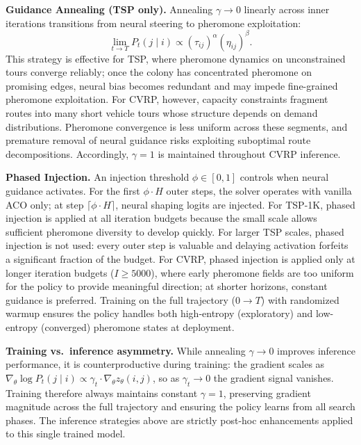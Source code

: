 \documentclass[sigconf]{acmart}
\begin{document}
\textbf{Guidance Annealing (TSP only).}
Annealing $\gamma \to 0$ linearly across inner iterations transitions from neural steering to pheromone exploitation:
\begin{equation}
\lim_{t \to T} P_t(j \mid i) \propto (\tau_{ij})^\alpha (\eta_{ij})^\beta.
\end{equation}
This strategy is effective for TSP, where pheromone dynamics on unconstrained tours converge reliably; once the colony has concentrated pheromone on promising edges, neural bias becomes redundant and may impede fine-grained pheromone exploitation.
For CVRP, however, capacity constraints fragment routes into many short vehicle tours whose structure depends on demand distributions.
Pheromone convergence is less uniform across these segments, and premature removal of neural guidance risks exploiting suboptimal route decompositions.
Accordingly, $\gamma{=}1$ is maintained throughout CVRP inference.

\textbf{Phased Injection.}
An injection threshold $\phi \in [0,1]$ controls when neural guidance activates.
For the first $\phi \cdot H$ outer steps, the solver operates with vanilla ACO only; at step $\lceil\phi \cdot H\rceil$, neural shaping logits are injected.
For TSP-1K, phased injection is applied at all iteration budgets because the small scale allows sufficient pheromone diversity to develop quickly.
For larger TSP scales, phased injection is not used: every outer step is valuable and delaying activation forfeits a significant fraction of the budget.
For CVRP, phased injection is applied only at longer iteration budgets ($I{\geq}5000$), where early pheromone fields are too uniform for the policy to provide meaningful direction; at shorter horizons, constant guidance is preferred.
Training on the full trajectory ($0 \to T$) with randomized warmup ensures the policy handles both high-entropy (exploratory) and low-entropy (converged) pheromone states at deployment.

\textbf{Training vs.\ inference asymmetry.}
While annealing $\gamma \to 0$ improves inference performance, it is counterproductive during training: the gradient scales as $\nabla_\theta \log P_t(j \mid i) \propto \gamma_t \cdot \nabla_\theta z_\theta(i,j)$, so as $\gamma_t \to 0$ the gradient signal vanishes.
Training therefore always maintains constant $\gamma{=}1$, preserving gradient magnitude across the full trajectory and ensuring the policy learns from all search phases.
The inference strategies above are strictly post-hoc enhancements applied to this single trained model.
\end{document}

